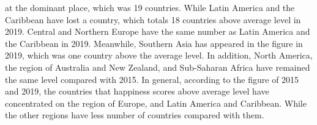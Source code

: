 \documentclass[11pt,a4paper,]{article}
\begin{document}
at the dominant place, which was 19 countries. While Latin America and the Caribbean have lost a country, which totals 18 countries above average level in 2019. Central and Northern Europe have the same number as Latin America and the Caribbean in 2019. Meanwhile, Southern Asia has appeared in the figure in 2019, which was one country above the average level. In addition, North America, the region of Australia and New Zealand, and Sub-Saharan Africa have remained the same level compared with 2015.
In general, according to the figure of 2015 and 2019, the countries that happiness scores above average level have concentrated on the region of Europe, and Latin America and Caribbean. While the other regions have less number of countries compared with them.

\printbibliography
\end{document}
